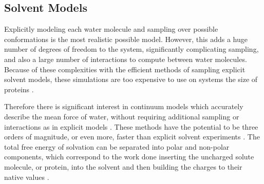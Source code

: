 \subsection{Solvent Models}
\label{subsection:solvent_models}

Explicitly modeling each water molecule and sampling over possible conformations is the most realistic possible model.
However, this adds a huge number of degrees of freedom to the system, significantly complicating sampling, and also a large number of interactions to compute between water molecules.
Because of these complexities with the efficient methods of sampling explicit solvent models, these simulations are too expensive to use on systems the size of proteins \cite{figueirido1997large,zhang2001solvent}.

Therefore there is significant interest in continuum models which accurately describe the mean force of water, without requiring additional sampling or interactions as in explicit models \cite{zhang2001solvent,still1990semianalytical,qiu1997gb}.
These methods have the potential to be three orders of magnitude, or even more, faster than explicit solvent experiments \cite{zhang2001solvent}.
The total free energy of solvation can be separated into polar and non-polar components, which correspond to the work done inserting the uncharged solute molecule, or protein, into the solvent and then building the charges to their native values \cite{roux1999implicit}.

\cite{roux1999implicit}
